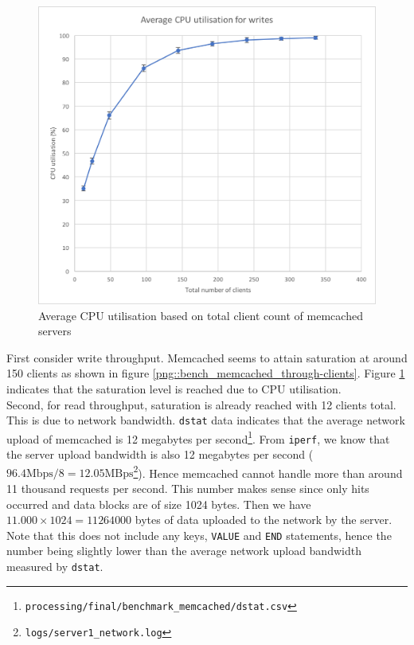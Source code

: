 \documentclass[11pt,a4paper]{article}
\begin{document}
\begin{figure}[!h]
\begin{minipage}[b]{.45\textwidth}
        \includegraphics[width=\textwidth]{processing/graphics/bench_memcached_cpu_util.png}
        \caption{Average CPU utilisation based on total client count of memcached servers}
        \label{png::bench_memcached_cpu_util}
    \end{minipage}
\end{figure}

First consider write throughput. Memcached seems to attain saturation at around 150 clients as shown in figure \ref{png::bench_memcached_through-clients}. Figure \ref{png::bench_memcached_cpu_util} indicates that the saturation level is reached due to CPU utilisation.\\
Second, for read throughput, saturation is already reached with 12 clients total. This is due to network bandwidth. \texttt{dstat} data indicates that the average network upload of memcached is 12 megabytes per second\footnote{\texttt{processing/final/benchmark_memcached/dstat.csv}}. From \texttt{iperf}, we know that the server upload bandwidth is also 12 megabytes per second ($96.4\text{Mbps}/8=12.05\text{MBps}$\footnote{\label{source::server_net}\texttt{logs/server1_network.log}}). Hence memcached cannot handle more than around 11 thousand requests per second. This number makes sense since only hits occurred and data blocks are of size 1024 bytes. Then we have $11.000 \times 1024 = 11 264 000$ bytes of data uploaded to the network by the server. Note that this does not include any keys, \texttt{VALUE} and \texttt{END} statements, hence the number being slightly lower than the average network upload bandwidth measured by \texttt{dstat}.
\end{document}
